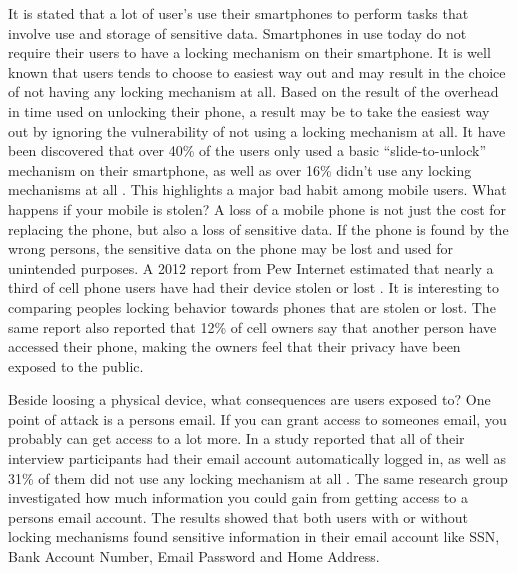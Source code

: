  It is stated that a lot of user's use their smartphones to perform tasks that involve use and storage of sensitive data. Smartphones in use today do not require their users to have a locking mechanism on their smartphone. It is well known that users tends to choose to easiest way out and may result in the choice of not having any locking mechanism at all. Based on the result of the overhead in time used on unlocking their phone, a result may be to take the easiest way out by ignoring the vulnerability of not using a locking mechanism at all. It have been discovered that over 40\% of the users only used a basic ``slide-to-unlock'' mechanism on their smartphone, as well as over 16\% didn't use any locking mechanisms at all \cite{habits3}. This highlights a major bad habit among mobile users. What happens if your mobile is stolen? A loss of a mobile phone is not just the cost for replacing the phone, but also a loss of sensitive data. If the phone is found by the wrong persons, the sensitive data on the phone may be lost and used for unintended purposes. A 2012 report from Pew Internet estimated that nearly a third of cell phone users have had their device stolen or lost \cite{StolenLost}. It is interesting to comparing peoples locking behavior towards phones that are stolen or lost. The same report also reported that 12\% of cell owners say that another person have accessed their phone, making the owners feel that their privacy have been exposed to the public.

  Beside loosing a physical device, what consequences are users exposed to? One point of attack is a persons email. If you can grant access to someones email, you probably can get access to a lot more. In a study reported that all of their interview participants had their email account automatically logged in, as well as 31\% of them did not use any locking mechanism at all \cite{Egelman}. The same research group investigated how much information you could gain from getting access to a persons email account. The results showed that both users with or without locking mechanisms found sensitive information in their email account like SSN, Bank Account Number, Email Password and Home Address.

